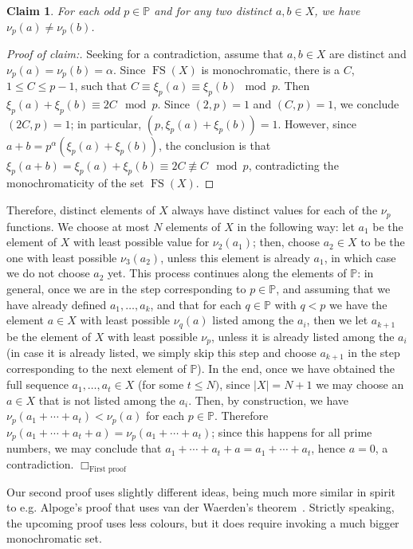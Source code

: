 \documentclass[10pt]{amsart}
\DeclareMathOperator{\fs}{FS}
\newtheorem{claim}{Claim}%
\theoremstyle{definition}
\begin{document}
\begin{claim}
For each odd $p\in\mathbb P$ and for any two distinct $a,b\in X$, we have $\nu_p(a)\neq\nu_p(b)$.
\end{claim}

\begin{proof}[Proof of claim:]
Seeking for a contradiction, assume that $a,b\in X$ are distinct and $\nu_p(a)=\nu_p(b)=\alpha$. Since $\fs(X)$ is monochromatic, there is a $C$, $1\leq C\leq p-1$, such that $C\equiv\xi_p(a)\equiv\xi_p(b)\mod p$. Then $\xi_p(a)+\xi_p(b)\equiv 2C\mod p$. Since $(2,p)=1$ and $(C,p)=1$, we conclude $(2C,p)=1$; in particular, $(p,\xi_p(a)+\xi_p(b))=1$. However, since $a+b=p^\alpha(\xi_p(a)+\xi_p(b))$, the conclusion is that $\xi_p(a+b)=\xi_p(a)+\xi_p(b)\equiv 2C\not\equiv C\mod p$, contradicting the monochromaticity of the set $\fs(X)$.
\end{proof}

Therefore, distinct elements of $X$ always have distinct values for each of the $\nu_p$ functions. We choose at most $N$ elements of $X$ in the following way: let $a_1$ be the element of $X$ with least possible value for $\nu_2(a_1)$; then, choose $a_2\in X$ to be the one with least possible $\nu_3(a_2)$, unless this element is already $a_1$, in which case we do not choose $a_2$ yet. This process continues along the elements of $\mathbb P$: in general, once we are in the step corresponding to $p\in\mathbb P$, and assuming that we have already defined $a_1,\ldots,a_k$, and that for each $q\in\mathbb P$ with $q<p$ we have the element $a\in X$ with least possible $\nu_q(a)$ listed among the $a_i$, then we let $a_{k+1}$ be the element of $X$ with least possible $\nu_p$, unless it is already listed among the $a_i$ (in case it is already listed, we simply skip this step and choose $a_{k+1}$ in the step corresponding to the next element of $\mathbb P$). In the end, once we have obtained the full sequence $a_1,\ldots,a_t\in X$ (for some $t\leq N)$, since $|X|=N+1$ we may choose an $a\in X$ that is not listed among the $a_i$. Then, by construction, we have $\nu_p(a_1+\cdots+a_t)<\nu_p(a)$ for each $p\in\mathbb P$. Therefore $\nu_p(a_1+\cdots+a_t+a)=\nu_p(a_1+\cdots+a_t)$; since this happens for all prime numbers, we may conclude that $a_1+\cdots+a_t+a=a_1+\cdots+a_t$, hence $a=0$, a contradiction.
\hfill$\Box_{\text{First proof}}$

Our second proof uses slightly different ideas, being much more similar in spirit to e.g. Alpoge's proof that uses van der Waerden's theorem~\cite{alpoge}. Strictly speaking, the upcoming proof uses less colours, but it does require invoking a much bigger monochromatic set.
\end{document}
